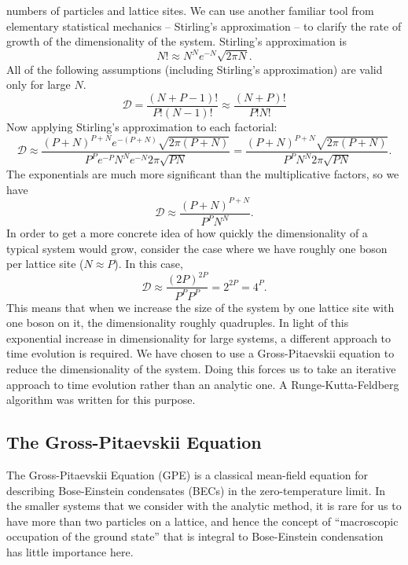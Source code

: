 \documentclass[a4paper, 10pt]{article}
\theoremstyle{plain}
\begin{document}
numbers of particles and lattice sites. We can use another familiar tool from
elementary statistical mechanics -- Stirling's approximation -- to clarify the
rate of growth of the dimensionality of the system. Stirling's
approximation \cite{Schroeder2007} is
\begin{equation}
    N! \approx N^{N} e^{-N} \sqrt{2 \pi N}.
\end{equation}
All of the following assumptions (including Stirling's approximation) are
valid only for large $N$.
\begin{equation*}
    \mathcal{D} = \frac{(N + P - 1)!}{P! (N-1)!}
    \approx
    \frac{(N + P)!}{P! N!}
\end{equation*}
Now applying Stirling's approximation to each factorial:
\begin{equation*}
    \mathcal{D}
    \approx
    \frac{(P + N)^{P+N} e^{-(P + N)} \sqrt{2 \pi (P+N)}}
         {P^{P} e^{-P} N^{N} e^{-N} 2 \pi \sqrt{PN}}
    =
    \frac{(P + N)^{P+N} \sqrt{2 \pi (P+N)}}
         {P^{P} N^{N} 2\pi \sqrt{PN}}.
\end{equation*}
The exponentials are much more significant than the multiplicative factors,
so we have
\begin{equation*}
    \mathcal{D} \approx \frac{(P + N)^{P+N}}{P^P N^N}.
\end{equation*}
In order to get a more concrete idea of how quickly the dimensionality of a
typical system would grow, consider the case where we have roughly one boson
per lattice site ($N \approx P$). In this case,
\begin{equation*}
    \mathcal{D} \approx \frac{(2P)^{2P}}{P^{P} P^{P}} = 2^{2P} = 4^{P}.
\end{equation*}
This means that when we increase the size of the system by one lattice site
with one boson on it, the dimensionality roughly quadruples. In light of
this exponential increase in dimensionality for large systems, a different
approach to time evolution is required. We have chosen to use a
Gross-Pitaevskii equation to reduce the dimensionality of the system. Doing
this forces us to take an iterative approach to time evolution rather than an
analytic one. A Runge-Kutta-Feldberg algorithm \cite{Burden2005} was written
for this purpose.


\subsection{The Gross-Pitaevskii Equation}

The Gross-Pitaevskii Equation (GPE) is a classical mean-field equation for
describing Bose-Einstein condensates (BECs) in the zero-temperature limit. In
the smaller systems that we consider with the analytic method, it is rare for us
to have more than two particles on a lattice, and hence the concept of
``macroscopic occupation of the ground state'' that is integral to Bose-Einstein
condensation has little importance here.
\end{document}
